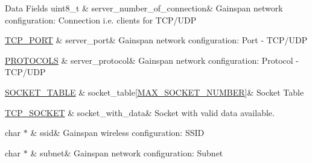 \begin{DoxyFields}{Data Fields}
uint8\+\_\+t\hypertarget{group__wireless__interface_a9755168efdcc1fb64e7338b5c62c8ef1}{}\label{group__wireless__interface_a9755168efdcc1fb64e7338b5c62c8ef1}
&
server\+\_\+number\+\_\+of\+\_\+connection&
Gainspan network configuration\+: Connection i.\+e. clients for T\+C\+P/\+U\+DP \\
\hline

\hyperlink{group__wireless__interface_ga6be486e56223df1b41c1f3a04cb7d471}{T\+C\+P\+\_\+\+P\+O\+RT}\hypertarget{group__wireless__interface_aab7c14a78228281b40bfc8abe2abef59}{}\label{group__wireless__interface_aab7c14a78228281b40bfc8abe2abef59}
&
server\+\_\+port&
Gainspan network configuration\+: Port -\/ T\+C\+P/\+U\+DP \\
\hline

\hyperlink{group__wireless__interface_ga2966051bfea778d846d94013f7cb888d}{P\+R\+O\+T\+O\+C\+O\+LS}\hypertarget{group__wireless__interface_a49b5c5cca3fbbe9af4cac44c8c765205}{}\label{group__wireless__interface_a49b5c5cca3fbbe9af4cac44c8c765205}
&
server\+\_\+protocol&
Gainspan network configuration\+: Protocol -\/ T\+C\+P/\+U\+DP \\
\hline

\hyperlink{group__wireless__interface_struct_s_o_c_k_e_t___t_a_b_l_e}{S\+O\+C\+K\+E\+T\+\_\+\+T\+A\+B\+LE}\hypertarget{group__wireless__interface_a5cc07995ba8fc00c0d15833ed8da47f9}{}\label{group__wireless__interface_a5cc07995ba8fc00c0d15833ed8da47f9}
&
socket\+\_\+table\mbox{[}\hyperlink{group__wireless__interface_ga319728830490f2d454bf2a76a906f55f}{M\+A\+X\+\_\+\+S\+O\+C\+K\+E\+T\+\_\+\+N\+U\+M\+B\+ER}\mbox{]}&
Socket Table \\
\hline

\hyperlink{group__wireless__interface_gab2d7ad3f99c2b04b0f5f5a77eefc5355}{T\+C\+P\+\_\+\+S\+O\+C\+K\+ET}\hypertarget{group__wireless__interface_afaa133b951258604c688931977df4ee9}{}\label{group__wireless__interface_afaa133b951258604c688931977df4ee9}
&
socket\+\_\+with\+\_\+data&
Socket with valid data available. \\
\hline

char $\ast$\hypertarget{group__wireless__interface_aa27e736d2fb8f629bc2570d3449faf12}{}\label{group__wireless__interface_aa27e736d2fb8f629bc2570d3449faf12}
&
ssid&
Gainspan wireless configuration\+: S\+S\+ID \\
\hline

char $\ast$\hypertarget{group__wireless__interface_a53f96559e039e9531f6375ac852bca13}{}\label{group__wireless__interface_a53f96559e039e9531f6375ac852bca13}
&
subnet&
Gainspan network configuration\+: Subnet \\
\hline


\end{DoxyFields}
